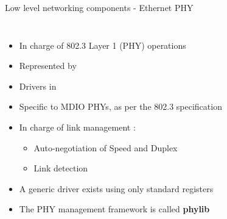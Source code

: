 \begin{frame}{Low level networking components - Ethernet PHY}
\begin{columns}
		\begin{itemize}
			\item In charge of 802.3 Layer 1 (PHY) operations
			\item Represented by 
			\item Drivers in 
			\item Specific to MDIO PHYs, as per the 802.3 specification
			\item In charge of link management :
				\begin{itemize}
					\item Auto-negotiation of Speed and Duplex
					\item Link detection
				\end{itemize}
			\item A generic driver exists using only standard registers
			\item The PHY management framework is called \textbf{phylib}
		\end{itemize}
	\end{columns}
\end{frame}

